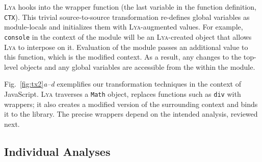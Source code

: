 \documentclass[letterpaper,twocolumn,10pt]{article}
\def\eg{{\em e.g.}, }
\newcommand{\ttt}[1]{\texttt{#1}}
\newcommand{\sx}[1]{(\S\ref{#1})}
\newcommand{\sys}{{\scshape Lya}\xspace}
\begin{document}


\sys hooks into the wrapper function (the last variable in the function definition, \ttt{CTX}).
This trivial source-to-source transformation re-defines global variables as module-locals and initializes them with \sys-augmented values.
For example, \ttt{console} in the context of the module will be an \sys-created object that allows \sys to interpose on it.
Evaluation of the module passes an additional value to this function, which is the modified context.
As a result, any changes to the top-level objects and any global variables are accessible from the within the module.




Fig.~\ref{fig:tx2}\emph{a--d} exemplifies our transformation techniques in the context of JavaScript.
\sys traverses a \ttt{Math} object, replaces functions such as \ttt{div} with wrappers; it also creates a modified version of the surrounding context and binds it to the library.
The precise wrappers depend on the intended analysis, reviewed next.


\subsection{Individual Analyses}
\label{impl2}
\end{document}
